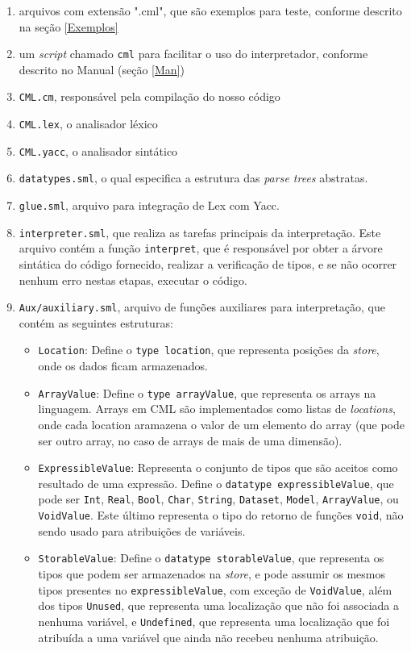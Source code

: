 \documentclass[12pt]{article}
\begin{document}
\begin{enumerate}
	\item arquivos com extensão ".cml", que são exemplos para teste, conforme descrito na seção \ref{Exemplos}
	\item um \textit{script} chamado \texttt{cml} para facilitar o uso do interpretador, conforme descrito no Manual (seção \ref{Man})
	\item \texttt{CML.cm}, responsável pela compilação do nosso código
	\item \texttt{CML.lex}, o analisador léxico
	\item \texttt{CML.yacc}, o analisador sintático
	\item \texttt{datatypes.sml}, o qual especifica a estrutura das \textit{parse trees} abstratas.
	\item \texttt{glue.sml}, arquivo para integração de Lex com Yacc.
	\item \texttt{interpreter.sml}, que realiza as tarefas principais da interpretação. Este arquivo contém a função \texttt{interpret}, que é responsável por obter a árvore sintática do código fornecido, realizar a verificação de tipos, e se não ocorrer nenhum erro nestas etapas, executar o código.
	\item \texttt{Aux/auxiliary.sml}, arquivo de funções auxiliares para interpretação, que contém as seguintes estruturas:
\begin{itemize}
\item \texttt{Location}: Define o  \texttt{type location}, que representa posições da \textit{store}, onde os dados ficam armazenados.

\item \texttt{ArrayValue}: Define o \texttt{type arrayValue}, que representa os arrays na linguagem. Arrays em CML são implementados como listas de \textit{locations}, onde cada location aramazena o valor de um elemento do array (que pode ser outro array, no caso de arrays de mais de uma dimensão).

\item \texttt{ExpressibleValue}: Representa o conjunto de tipos que são aceitos como resultado de uma expressão. Define o \texttt{datatype expressibleValue}, que pode ser \texttt{Int}, \texttt{Real}, \texttt{Bool}, \texttt{Char}, \texttt{String}, \texttt{Dataset}, \texttt{Model}, \texttt{ArrayValue}, ou \texttt{VoidValue}. Este último representa o tipo do retorno de funções \texttt{void}, não sendo usado para atribuições de variáveis.

\item \texttt{StorableValue}: Define o \texttt{datatype storableValue}, que representa os tipos que podem ser armazenados na \textit{store}, e pode assumir os mesmos tipos presentes no \texttt{expressibleValue}, com exceção de \texttt{VoidValue}, além dos tipos \texttt{Unused}, que representa uma localização que não foi associada a nenhuma variável, e \texttt{Undefined}, que representa uma localização que foi atribuída a uma variável que ainda não recebeu nenhuma atribuição.


\end{itemize}
\end{enumerate}
\end{document}
